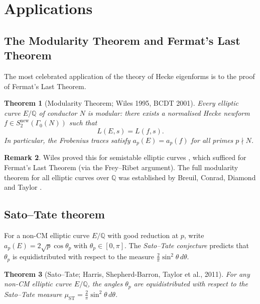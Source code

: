 \documentclass[12pt,a4paper]{amsart}
\newtheorem{theorem}{Theorem}[section]
\theoremstyle{definition}
\newtheorem{remark}[theorem]{Remark}
\begin{document}
\section{Applications}

\subsection{The Modularity Theorem and Fermat's Last Theorem}

The most celebrated application of the theory of Hecke eigenforms is to the
proof of Fermat's Last Theorem.

\begin{theorem}[Modularity Theorem; Wiles 1995, BCDT 2001]\label{thm:modularity}
  Every elliptic curve $E/\mathbb{Q}$ of conductor $N$ is modular: there exists
  a normalised Hecke newform $f \in S_2^{\mathrm{new}}(\Gamma_0(N))$ such that
  \[
    L(E,s) = L(f,s).
  \]
  In particular, the Frobenius traces satisfy $a_p(E) = a_p(f)$ for all
  primes $p \nmid N$.
\end{theorem}

\begin{remark}
  Wiles proved this for semistable elliptic curves \cite{Wiles95}, which
  sufficed for Fermat's Last Theorem (via the Frey--Ribet argument). The full
  modularity theorem for all elliptic curves over $\mathbb{Q}$ was established
  by Breuil, Conrad, Diamond and Taylor \cite{BCDT}.
\end{remark}

\subsection{Sato--Tate theorem}

For a non-CM elliptic curve $E/\mathbb{Q}$ with good reduction at $p$, write
$a_p(E) = 2\sqrt{p}\cos\theta_p$ with $\theta_p \in [0,\pi]$. The
\emph{Sato--Tate conjecture} predicts that $\theta_p$ is equidistributed with
respect to the measure $\frac{2}{\pi}\sin^2\theta\,d\theta$.

\begin{theorem}[Sato--Tate; Harris, Shepherd-Barron, Taylor et al., 2011]
  For any non-CM elliptic curve $E/\mathbb{Q}$, the angles $\theta_p$ are
  equidistributed with respect to the Sato--Tate measure
  $\mu_{\mathrm{ST}} = \frac{2}{\pi}\sin^2\theta\,d\theta$.
\end{theorem}
\end{document}
